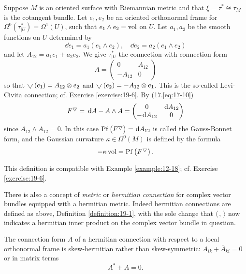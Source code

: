 \begin{example}\label{example:19-5}
  Suppose $M$ is an oriented surface with Riemannian metric and that $\xi=\tau^{*} \cong \tau_{M}$ is 
  the cotangent bundle. Let $e_{1}, e_{2}$ be an oriented orthonormal frame 
  for $\Omega^{0}\left(\tau_{\mid U}^{*}\right)=\Omega^{1}(U)$, such that $e_{1} \wedge e_{2}=\mathrm{vol}$ 
  on $U$. Let $a_{1}, a_{2}$ be the smooth functions on $U$ determined by
  \[
    \dd e_{1}=a_{1}\left(e_{1} \wedge e_{2}\right), \quad \dd e_{2}=a_{2}\left(e_{1} \wedge e_{2}\right)
  \]
  and let $A_{12}=a_{1} e_{1}+a_{2} e_{2}$. We give $\tau_{\mid U}^{*}$ the connection with connection form
  \[
    A=\begin{pmatrix}
      0 & A_{12} \\
      -A_{12} & 0
    \end{pmatrix}
  \]
  so that $\bigtriangledown\left(e_{1}\right)=A_{12} \otimes e_{2}$ and $\bigtriangledown\left(e_{2}\right)=-A_{12} \otimes e_{1}$. 
  This is the so-called Levi-Civita connection; cf. Exercise \ref{exercise:19-6}. By (17.\ref{eq:17-10})
  \[
    F^{\btd}=\dd A-A \wedge A =
    \begin{pmatrix}
      0 & \dd A_{12} \\
      -\dd A_{12} & 0
    \end{pmatrix}
  \]
  since $A_{12} \wedge A_{12}=0$. In this case $\R{Pf}\left(F^{\btd}\right)=\dd A_{12}$ is called the 
  Gauss-Bonnet form, and the Gaussian curvature $\kappa \in \Omega^{0}(M)$ is defined by the formula
  \[
    -\kappa\, \mathrm{vol}=\mathrm{Pf}\left(F^{\bigtriangledown}\right) .
  \]

  This definition is compatible with Example \ref{example:12-18}; cf. Exercise \ref{exercise:19-6}.
\end{example}

There is also a concept of \textit{metric} or \textit{hermitian connection} 
for complex vector bundles equipped with a hermitian metric. Indeed hermitian connections are defined as above, Definition \ref{definition:19-1}, 
with the sole change that $\langle\,,\,\rangle$ now indicates a hermitian inner product on the complex vector bundle in question.


The connection form $A$ of a hermitian connection with respect to a local orthonormal frame is skew-hermitian 
rather than skew-symmetric: $A_{i k}+\bar{A}_{k i}=0$ or in matrix terms
\begin{equation}\label{eq:19-5}
  A^{*}+A = 0. 
\end{equation}


